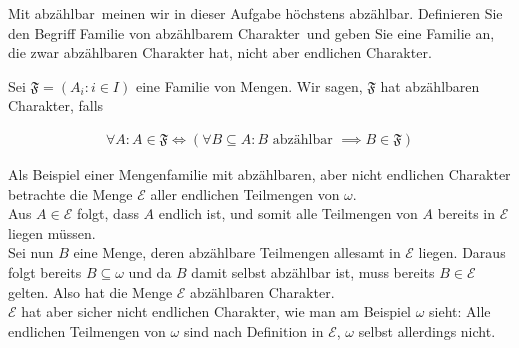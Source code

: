 
\begin{exercise}[278]

Mit \glqq abzählbar\grqq\  meinen wir in dieser Aufgabe \glqq höchstens abzählbar\grqq.
Definieren Sie den Begriff \glqq Familie von abzählbarem Charakter\grqq\ und geben
Sie eine Familie an, die zwar abzählbaren Charakter hat, nicht aber endlichen Charakter.

\end{exercise}


\begin{solution}

Sei $\mathfrak{F} = (A_i: i \in I)$ eine Familie von Mengen. Wir sagen, $\mathfrak{F}$
hat abzählbaren Charakter, falls

\begin{align*}
  \forall A: A \in \mathfrak{F} \iff (\forall B \subseteq A: B \text{ abzählbar } \implies B \in \mathfrak{F})
\end{align*}

Als Beispiel einer Mengenfamilie mit abzählbaren, aber nicht endlichen Charakter
betrachte die Menge $\mathcal{E}$ aller endlichen Teilmengen von $\omega$. \\
Aus $A \in \mathcal{E}$ folgt, dass $A$ endlich ist, und somit alle Teilmengen
von $A$ bereits in $\mathcal{E}$ liegen müssen. \\
Sei nun $B$ eine Menge, deren abzählbare Teilmengen allesamt in $\mathcal{E}$
liegen. Daraus folgt bereits $B \subseteq \omega$ und da $B$ damit selbst abzählbar ist,
muss bereits $B \in \mathcal{E}$ gelten. Also hat die Menge $\mathcal{E}$ abzählbaren
Charakter. \\
$\mathcal{E}$ hat aber sicher nicht endlichen Charakter, wie man am Beispiel $\omega$
sieht: Alle endlichen Teilmengen von $\omega$ sind nach Definition in $\mathcal{E}$,
$\omega$ selbst allerdings nicht.
\end{solution}


